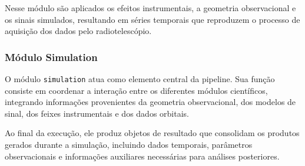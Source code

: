 Nesse módulo são aplicados os efeitos instrumentais, a geometria observacional e os sinais simulados, resultando em séries temporais que reproduzem o processo de aquisição dos dados pelo radiotelescópio.

\subsubsection{Módulo Simulation}

O módulo \texttt{simulation} atua como elemento central da pipeline. Sua função consiste em coordenar a interação entre os diferentes módulos científicos, integrando informações provenientes da geometria observacional, dos modelos de sinal, dos feixes instrumentais e dos dados orbitais.

Ao final da execução, ele produz objetos de resultado que consolidam os produtos gerados durante a simulação, incluindo dados temporais, parâmetros observacionais e informações auxiliares necessárias para análises posteriores.
